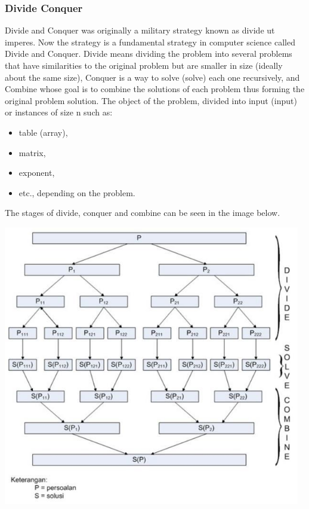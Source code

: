 \documentclass[12pt,titlepage]{article}
\begin{document}
\subsubsection{Divide Conquer}
Divide and Conquer was originally a military strategy known as divide ut imperes. Now the strategy is a fundamental strategy in computer science called Divide and Conquer. Divide means dividing the problem into several problems that have similarities to the original problem but are smaller in size (ideally about the same size), Conquer is a way to solve (solve) each one recursively, and Combine whose goal is to combine the solutions of each problem thus forming the original problem solution. The object of the problem, divided into input (input) or instances of size n such as:
\begin{itemize}
    \item table (array),
    \item matrix,
    \item exponent,
    \item etc., depending on the problem.
\end{itemize}
The stages of divide, conquer and combine can be seen in the image below.
\mbox{}\\
\begin{center}
    \includegraphics[width=13cm]{./images/figures/fig1.jpg}
\end{center}
\mbox{}\\
\end{document}

